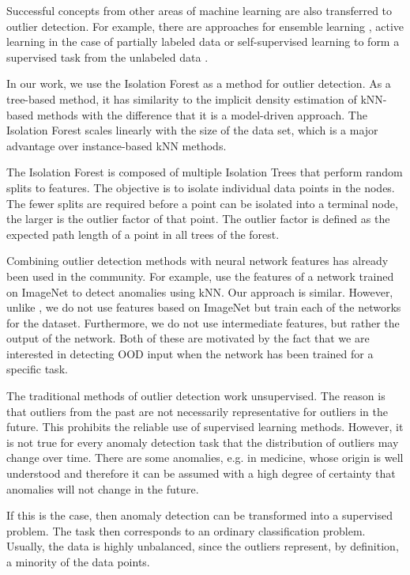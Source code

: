 \documentclass{article}
\begin{document}
Successful concepts from other areas of machine learning are also transferred to outlier detection. For example, there are approaches for ensemble learning \cite{Chen.2017b, Zimek.2014, Zimek.2014b, Zimek.2013}, active learning in the case of partially labeled data \cite{Abe.2006, Liu.2019, Trittenbach.2019, Trittenbach.2021} or self-supervised learning to form a supervised task from the unlabeled data \cite{Diers.2021, Li.2021, Sehwag.2021}.

In our work, we use the Isolation Forest \cite{Liu.2008} as a method for outlier detection. As a tree-based method, it has similarity to the implicit density estimation of kNN-based methods with the difference that it is a model-driven approach. The Isolation Forest scales linearly with the size of the data set, which is a major advantage over instance-based kNN methods.

The Isolation Forest is composed of multiple Isolation Trees that perform random splits to features. The objective is to isolate individual data points in the nodes. The fewer splits are required before a point can be isolated into a terminal node, the larger is the outlier factor of that point. The outlier factor is defined as the expected path length of a point in all trees of the forest.

Combining outlier detection methods with neural network features has already been used in the community. For example, \cite{Bergman.2020} use the features of a network trained on ImageNet to detect anomalies using kNN. Our approach is similar. However, unlike \cite{Bergman.2020}, we do not use features based on ImageNet but train each of the networks for the dataset. Furthermore, we do not use intermediate features, but rather the output of the network. Both of these are motivated by the fact that we are interested in detecting OOD input when the network has been trained for a specific task.

The traditional methods of outlier detection work unsupervised. The reason is that outliers from the past are not necessarily representative for outliers in the future. This prohibits the reliable use of supervised learning methods. However, it is not true for every anomaly detection task that the distribution of outliers may change over time. There are some anomalies, e.g. in medicine, whose origin is well understood and therefore it can be assumed with a high degree of certainty that anomalies will not change in the future.

If this is the case, then anomaly detection can be transformed into a supervised problem. The task then corresponds to an ordinary classification problem. Usually, the data is highly unbalanced, since the outliers represent, by definition, a minority of the data points.
\end{document}
